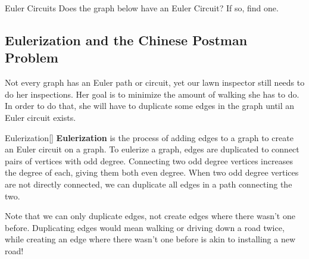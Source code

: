 \begin{ex}{Euler Circuits}{}
Does the graph below have an Euler Circuit?  If so, find one.\\

\end{ex}

\subsection{Eulerization and the Chinese Postman Problem}
Not every graph has an Euler path or circuit, yet our lawn inspector still needs to do her inspections.  Her goal is to minimize the amount of walking she has to do.  In order to do that, she will have to duplicate some edges in the graph until an Euler circuit exists. 

\begin{definition}{Eulerization}[]
\textbf{Eulerization} is the process of adding edges to a graph to create an Euler circuit on a graph.  To eulerize a graph, edges are duplicated to connect pairs of vertices with odd degree.  Connecting two odd degree vertices increases the degree of each, giving them both even degree.  When two odd degree vertices are not directly connected, we can duplicate all edges in a path connecting the two.
\end{definition}

Note that we can only duplicate edges, not create edges where there wasn't one before.  Duplicating edges would mean walking or driving down a road twice, while creating an edge where there wasn't one before is akin to installing a new road!

